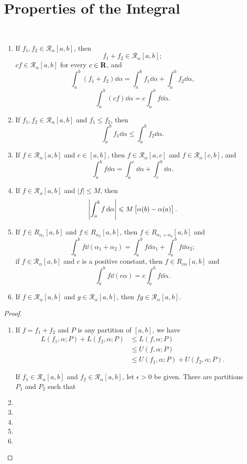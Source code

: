 \section{Properties of the Integral}
\begin{theorem} \
\begin{enumerate}[label=(\roman*)]
\item If $f_1,f_2\in \mathcal{R}_\alpha[a,b]$, then 
\[ f_1+f_2\in \mathcal{R}_\alpha[a,b]; \]
$cf\in \mathcal{R}_\alpha[a,b]$ for every $c\in\mathbf R$, and
\[ \int_a^b(f_1+f_2)\dd{\alpha}=\int_a^bf_1\dd{\alpha}+\int_a^bf_2\dd{\alpha}, \]
\[ \int_a^b(cf)\dd{\alpha}=c\int_a^bf\dd{\alpha}. \]

\item If $f_1,f_2\in \mathcal{R}_\alpha[a,b]$ and $f_1\le f_2$, then
\[ \int_a^bf_1\dd{\alpha}\le\int_a^bf_2\dd{\alpha}. \]

\item If $f\in \mathcal{R}_\alpha[a,b]$ and $c\in[a,b]$, then $f\in \mathcal{R}_\alpha[a,c]$ and $f\in \mathcal{R}_\alpha[c,b]$, and
\[ \int_a^bf\dd{\alpha}=\int_a^c\dd{\alpha}+\int_c^b\dd{\alpha}. \]

\item If $f\in \mathcal{R}_\alpha[a,b]$ and $|f|\le M$, then
\[ \left|\int_a^bf\dd{\alpha}\right|\leqslant M\left[\alpha(b)-\alpha(a)\right]. \]

\item If $f\in R_{\alpha_1}[a,b]$ and $f\in R_{\alpha_2}[a,b]$, then $f\in R_{\alpha_1+\alpha_2}[a,b]$ and
\[ \int_a^bf\dd{(\alpha_1+\alpha_2)}=\int_a^bf\dd{\alpha_1}+\int_a^bf\dd{\alpha_2}; \]
if $f\in \mathcal{R}_\alpha[a,b]$ and $c$ is a positive constant, then $f\in R_{c\alpha}[a,b]$ and
\[ \int_a^bf\dd{(c\alpha)}=c\int_a^bf\dd{\alpha}. \]

\item If $f\in \mathcal{R}_\alpha[a,b]$ and $g\in \mathcal{R}_\alpha[a,b]$, then $fg\in \mathcal{R}_\alpha[a,b]$.
\end{enumerate}
\end{theorem}

\begin{proof} \
\begin{enumerate}[label=(\roman*)]
\item If $f=f_1+f_2$ and $P$ is any partition of $[a,b]$, we have
\begin{align*}
L(f_1,\alpha;P)+L(f_2,\alpha;P)&\le L(f,\alpha;P)\\
&\le U(f,\alpha;P)\\
&\le U(f_1,\alpha;P)+U(f_2,\alpha;P).
\end{align*}

If $f_1\in \mathcal{R}_\alpha[a,b]$ and $f_2\in \mathcal{R}_\alpha[a,b]$, let $\epsilon>0$ be given. There are partitions $P_1$ and $P_2$ such that


\item 
\item 
\item 
\item 
\item 
\end{enumerate}
\end{proof}

